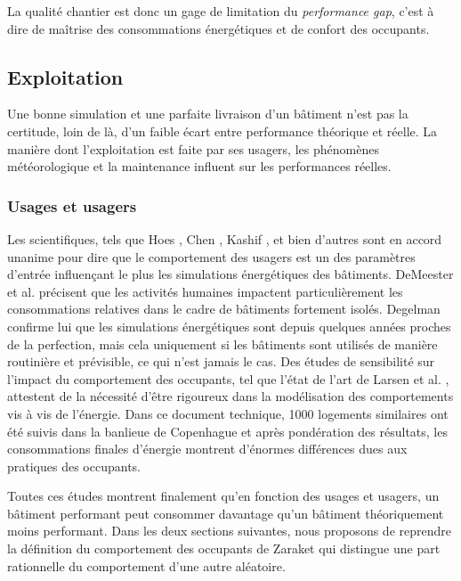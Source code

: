 La qualité chantier est donc un gage de limitation du \textit{performance gap}, c'est à dire de maîtrise des consommations énergétiques et de confort des occupants.

\subsection{Exploitation}

Une bonne simulation et une parfaite livraison d'un bâtiment n'est pas la certitude, loin de là, d'un faible écart entre performance théorique et réelle. La manière dont l'exploitation est faite par ses usagers, les phénomènes météorologique et la maintenance influent sur les performances réelles.

\subsubsection{Usages et usagers}
\label{Usages et usagers}

Les scientifiques, tels que Hoes \cite{Hoes-09}, Chen \cite{Chen-12}, Kashif \cite{Kashif-13}, et bien d'autres sont en accord unanime pour dire que le comportement des usagers est un des paramètres d'entrée influençant le plus les simulations énergétiques des bâtiments. DeMeester et al. \cite{deMeester-13} précisent que les activités humaines impactent particulièrement les consommations relatives dans le cadre de bâtiments fortement isolés. Degelman \cite{Degelman-99} confirme lui que les simulations énergétiques sont depuis quelques années proches de la perfection, mais cela uniquement si les bâtiments sont utilisés de manière routinière et prévisible, ce qui n'est jamais le cas. Des études de sensibilité sur l'impact du comportement des occupants, tel que l'état de l'art de Larsen et al. \cite{Larsen-10}, attestent de la nécessité d'être rigoureux dans la modélisation des comportements vis à vis de l'énergie. Dans ce document technique, 1000 logements similaires ont été suivis dans la banlieue de Copenhague et après pondération des résultats, les consommations finales d'énergie montrent d'énormes différences dues aux pratiques des occupants. 

Toutes ces études montrent finalement qu'en fonction des usages et usagers, un bâtiment performant peut consommer davantage qu'un bâtiment théoriquement moins performant. Dans les deux sections suivantes, nous proposons de reprendre la définition du comportement des occupants de Zaraket \cite{Zaraket-14} qui distingue une part rationnelle du comportement d'une autre aléatoire.


